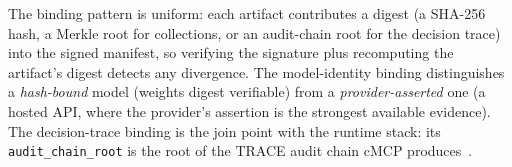 The binding pattern is uniform: each artifact contributes a digest (a SHA-256 hash, a
Merkle root for collections, or an audit-chain root for the decision trace) into the
signed manifest, so verifying the signature plus recomputing the artifact's digest
detects any divergence. The model-identity binding distinguishes a \emph{hash-bound}
model (weights digest verifiable) from a \emph{provider-asserted} one (a hosted API,
where the provider's assertion is the strongest available evidence). The
decision-trace binding is the join point with the runtime stack: its
\texttt{audit\_chain\_root} is the root of the TRACE audit chain cMCP
produces~\citep{trace2026,cmcp2026}.
